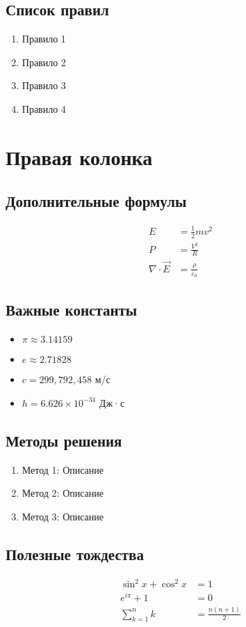 \documentclass[10pt,landscape,a4paper]{article}
\begin{document}
\begin{multicols}{2}
\subsection{Список правил}
\begin{enumerate}
    \item Правило 1
    \item Правило 2
    \item Правило 3
    \item Правило 4
\end{enumerate}

\section{Правая колонка}

\subsection{Дополнительные формулы}
\begin{align}
    E &= \frac{1}{2}mv^2 \\
    P &= \frac{V^2}{R} \\
    \nabla \cdot \vec{E} &= \frac{\rho}{\varepsilon_0}
\end{align}

\subsection{Важные константы}
\begin{itemize}
    \item $\pi \approx 3.14159$
    \item $e \approx 2.71828$
    \item $c = 299,792,458$ м/с
    \item $h = 6.626 \times 10^{-34}$ Дж·с
\end{itemize}

\subsection{Методы решения}
\begin{enumerate}
    \item Метод 1: Описание
    \item Метод 2: Описание
    \item Метод 3: Описание
\end{enumerate}

\subsection{Полезные тождества}
\begin{align}
    \sin^2 x + \cos^2 x &= 1 \\
    e^{i\pi} + 1 &= 0 \\
    \sum_{k=1}^n k &= \frac{n(n+1)}{2}
\end{align}


\end{multicols}
\end{document}
